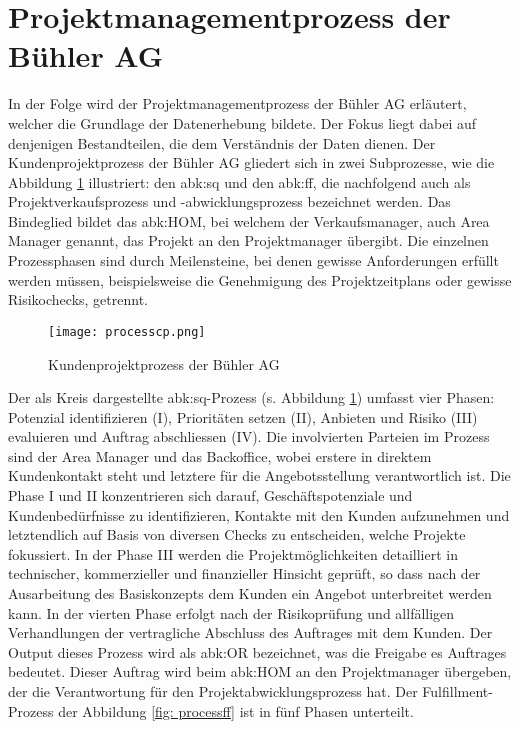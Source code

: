 \section{Projektmanagementprozess der Bühler AG}\label{sec:pmbueh}
In der Folge wird der Projektmanagementprozess der Bühler AG erläutert, welcher die Grundlage der Datenerhebung bildete. Der Fokus liegt dabei auf denjenigen Bestandteilen, die dem Verständnis der Daten dienen. Der Kundenprojektprozess der Bühler AG gliedert sich in zwei Subprozesse, wie die Abbildung \ref{fig:processcp} illustriert: den \gls{abk:sq} und den \gls{abk:ff}, die nachfolgend auch als Projektverkaufsprozess und -abwicklungsprozess bezeichnet werden. Das Bindeglied bildet das \gls{abk:HOM}, bei welchem der Verkaufsmanager, auch Area Manager genannt, das Projekt an den Projektmanager übergibt. Die einzelnen Prozessphasen sind durch Meilensteine, bei denen gewisse Anforderungen erfüllt werden müssen, beispielsweise die Genehmigung des Projektzeitplans oder gewisse Risikochecks, getrennt.
\begin{figure}[H]
	\centering
	\texttt{[image: processcp.png]}
	\caption{Kundenprojektprozess der Bühler AG}
	\label{fig:processcp}
\end{figure}
Der als Kreis dargestellte \gls{abk:sq}-Prozess (s. Abbildung \ref{fig:processcp}) umfasst vier Phasen: Potenzial identifizieren (I), Prioritäten setzen (II), Anbieten und Risiko (III) evaluieren und Auftrag abschliessen (IV). Die involvierten Parteien im Prozess sind der Area Manager und das Backoffice, wobei erstere in direktem Kundenkontakt steht und letztere für die Angebotsstellung verantwortlich ist. Die Phase I und II konzentrieren sich darauf, Geschäftspotenziale und Kundenbedürfnisse zu identifizieren, Kontakte mit den Kunden aufzunehmen und letztendlich auf Basis von diversen Checks zu entscheiden, welche Projekte fokussiert. In der Phase III werden die Projektmöglichkeiten detailliert in technischer, kommerzieller und finanzieller Hinsicht geprüft, so dass nach der Ausarbeitung des Basiskonzepts dem Kunden ein Angebot unterbreitet werden kann. In der vierten Phase erfolgt nach der Risikoprüfung und allfälligen Verhandlungen der vertragliche Abschluss des Auftrages mit dem Kunden. Der Output dieses Prozess wird als \gls{abk:OR} bezeichnet, was die Freigabe es Auftrages bedeutet. Dieser Auftrag wird beim \gls{abk:HOM} an den Projektmanager übergeben, der die Verantwortung für den Projektabwicklungsprozess hat. Der Fulfillment-Prozess der Abbildung \ref{fig: processff} ist in fünf Phasen unterteilt. 
